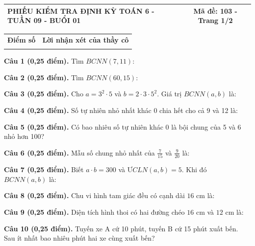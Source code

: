 \documentclass[12pt,a4paper]{article}
\begin{document}
\newpage
\noindent
\begin{tabularx}{\linewidth}{|X|c|}
\hline
\textbf{PHIẾU KIỂM TRA ĐỊNH KỲ TOÁN 6 - TUẦN 09 - BUỔI 01} & \textbf{Mã đề: 103 - Trang 1/2} \\
\hline
\end{tabularx}

\vspace{1.0mm}

\noindent
\begin{tabularx}{\linewidth}{|p{3.2cm}|X|}
\hline
\centering\textbf{Điểm số} & \centering\textbf{Lời nhận xét của thầy cô} \tabularnewline
\rule{0pt}{1.8cm} & \\
\hline
\end{tabularx}

\vspace{1.0mm}

\noindent\textbf{Câu 1 (0,25 điểm).} Tìm $BCNN(7, 11)$: \par\vspace{0.25mm}
\noindent\textbf{Câu 2 (0,25 điểm).} Tìm $BCNN(60, 15)$: \par\vspace{0.25mm}
\noindent\textbf{Câu 3 (0,25 điểm).} Cho $a = 3^2 \cdot 5$ và $b = 2 \cdot 3 \cdot 5^2$. Giá trị $BCNN(a, b)$ là: \par\vspace{0.25mm}
\noindent\textbf{Câu 4 (0,25 điểm).} Số tự nhiên nhỏ nhất khác 0 chia hết cho cả 9 và 12 là: \par\vspace{0.25mm}
\noindent\textbf{Câu 5 (0,25 điểm).} Có bao nhiêu số tự nhiên khác 0 là bội chung của 5 và 6 nhỏ hơn 100? \par\vspace{0.25mm}
\noindent\textbf{Câu 6 (0,25 điểm).} Mẫu số chung nhỏ nhất của $\frac{7}{15}$ và $\frac{9}{20}$ là: \par\vspace{0.25mm}
\noindent\textbf{Câu 7 (0,25 điểm).} Biết $a \cdot b = 300$ và $ƯCLN(a, b) = 5$. Khi đó $BCNN(a, b)$ là: \par\vspace{0.25mm}
\noindent\textbf{Câu 8 (0,25 điểm).} Chu vi hình tam giác đều có cạnh dài $16\text{ cm}$ là: \par\vspace{0.25mm}
\noindent\textbf{Câu 9 (0,25 điểm).} Diện tích hình thoi có hai đường chéo $16\text{ cm}$ và $12\text{ cm}$ là: \par\vspace{0.25mm}
\noindent\textbf{Câu 10 (0,25 điểm).} Tuyến xe A cứ 10 phút, tuyến B cứ 15 phút xuất bến. Sau ít nhất bao nhiêu phút hai xe cùng xuất bến? \par\vspace{0.25mm}
\end{document}
